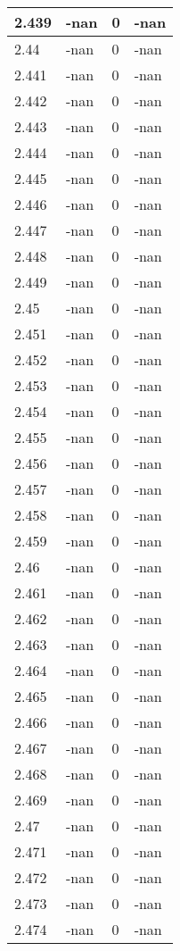 \documentclass[a4paper,14pt]{extarticle}
\begin{document}
\begin{longtable}{||m{3cm}||m{3cm}|m{3cm}||m{3cm}||}
\hline
2.439 & -nan & 0 & -nan\\
\hline
2.44 & -nan & 0 & -nan\\
\hline
2.441 & -nan & 0 & -nan\\
\hline
2.442 & -nan & 0 & -nan\\
\hline
2.443 & -nan & 0 & -nan\\
\hline
2.444 & -nan & 0 & -nan\\
\hline
2.445 & -nan & 0 & -nan\\
\hline
2.446 & -nan & 0 & -nan\\
\hline
2.447 & -nan & 0 & -nan\\
\hline
2.448 & -nan & 0 & -nan\\
\hline
2.449 & -nan & 0 & -nan\\
\hline
2.45 & -nan & 0 & -nan\\
\hline
2.451 & -nan & 0 & -nan\\
\hline
2.452 & -nan & 0 & -nan\\
\hline
2.453 & -nan & 0 & -nan\\
\hline
2.454 & -nan & 0 & -nan\\
\hline
2.455 & -nan & 0 & -nan\\
\hline
2.456 & -nan & 0 & -nan\\
\hline
2.457 & -nan & 0 & -nan\\
\hline
2.458 & -nan & 0 & -nan\\
\hline
2.459 & -nan & 0 & -nan\\
\hline
2.46 & -nan & 0 & -nan\\
\hline
2.461 & -nan & 0 & -nan\\
\hline
2.462 & -nan & 0 & -nan\\
\hline
2.463 & -nan & 0 & -nan\\
\hline
2.464 & -nan & 0 & -nan\\
\hline
2.465 & -nan & 0 & -nan\\
\hline
2.466 & -nan & 0 & -nan\\
\hline
2.467 & -nan & 0 & -nan\\
\hline
2.468 & -nan & 0 & -nan\\
\hline
2.469 & -nan & 0 & -nan\\
\hline
2.47 & -nan & 0 & -nan\\
\hline
2.471 & -nan & 0 & -nan\\
\hline
2.472 & -nan & 0 & -nan\\
\hline
2.473 & -nan & 0 & -nan\\
\hline
2.474 & -nan & 0 & -nan\\

\end{longtable}
\end{document}
